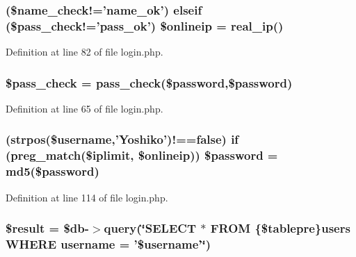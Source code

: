 \hypertarget{login_8php_a9b506b60a207d96f993a3266895cf03d}{
\subsubsection[{\$onlineip}]{ (\$name\+\_\+check!='name\+\_\+ok') {\bf elseif} (\$pass\+\_\+check!='pass\+\_\+ok') \$onlineip = {\bf real\+\_\+ip}()}}\label{login_8php_a9b506b60a207d96f993a3266895cf03d}


Definition at line 82 of file login.\+php.

\hypertarget{login_8php_a76201d3af958e2a6795d5cfb51667399}{
\subsubsection[{\$pass\+\_\+check}]{\setlength{\rightskip}{0pt plus 5cm}\${\bf pass\+\_\+check} = {\bf pass\+\_\+check}(\$password,\$password)}}\label{login_8php_a76201d3af958e2a6795d5cfb51667399}


Definition at line 65 of file login.\+php.

\hypertarget{login_8php_a600d4d2f6f0503643a7b30e45f0d923d}{
\subsubsection[{\$password}]{ (strpos(\$username,'Yoshiko')!=={\bf false}) {\bf if} (preg\+\_\+match(\$iplimit, \$onlineip)) \$password = md5(\$password)}}\label{login_8php_a600d4d2f6f0503643a7b30e45f0d923d}


Definition at line 114 of file login.\+php.

\hypertarget{login_8php_a112ef069ddc0454086e3d1e6d8d55d07}{
\subsubsection[{\$result}]{\setlength{\rightskip}{0pt plus 5cm}\${\bf result} = \$db-\/$>$query(\char`\"{}S\+E\+L\+E\+C\+T $\ast$ F\+R\+O\+M \{\$tablepre\}users W\+H\+E\+R\+E username = '\$username'\char`\"{})}}\label{login_8php_a112ef069ddc0454086e3d1e6d8d55d07}



